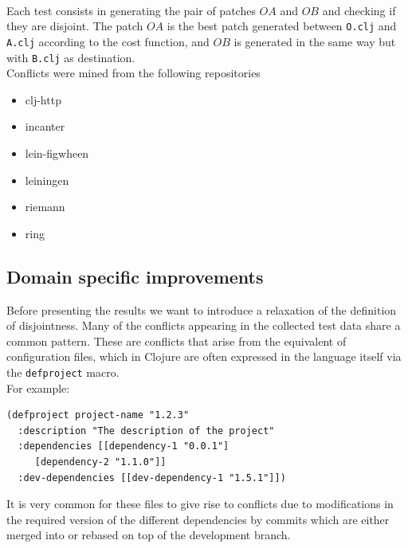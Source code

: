 \documentclass[11pt, titlepage]{article}
\newcommand{\toHaskell}[1]{\texttt{#1}\xspace}
\newcommand{\toClojure}[1]{\texttt{#1}\xspace}
\begin{document}
\\
Each test consists in generating the pair of patches $OA$ and $OB$ and checking if they are disjoint. 
The patch $OA$ is the best patch generated between \texttt{O.clj} and \texttt{A.clj} according to the cost function, and $OB$ is generated in the same way but with \toHaskell{B.clj} as destination.
\\
Conflicts were mined from the following repositories
 \begin{itemize}
    \item clj-http
    \item incanter
    \item lein-figwheen
    \item leiningen
    \item riemann
    \item ring
 \end{itemize}

\subsection{Domain specific improvements}

Before presenting the results we want to introduce a relaxation of the definition of disjointness. Many of the conflicts appearing in the collected test data share a common pattern. These are conflicts that arise from the equivalent of configuration files, which in Clojure are often expressed in the language itself via the \toClojure{defproject} macro.
\\
For example:

\begin{verbatim}
(defproject project-name "1.2.3"
  :description "The description of the project"
  :dependencies [[dependency-1 "0.0.1"]
     [dependency-2 "1.1.0"]]
  :dev-dependencies [[dev-dependency-1 "1.5.1"]])
\end{verbatim}

It is very common for these files to give rise to conflicts due to modifications in the required version of the different dependencies by commits which are either merged into or rebased on top of the development branch. 
\end{document}
